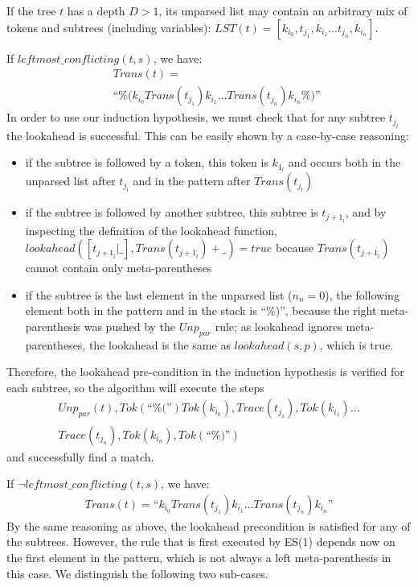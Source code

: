 \documentclass{sigplanconf}
\begin{document}
If the tree $t$ has a depth $D>1$, its unparsed list may contain an
arbitrary mix of tokens and subtrees (including variables):
$LST(t)=[k_{i_0}, t_{j_1}, k_{i_1} \dots t_{j_n}, k_{i_n}]$.

If $leftmost\_conflicting(t,s)$, we have:
\begin{eqnarray*}
&&Trans(t) = \\
&& \mbox{``\%(} k_{i_0}
Trans(t_{j_1}) k_{i_1} \dots Trans(t_{j_n}) k_{i_n}
\mbox{\%)''}\
\end{eqnarray*}
In order to use our induction hypothesis, we must check that for any
subtree $t_{j_l}$ the lookahead is successful. This can be easily
shown by a case-by-case reasoning:
\begin{itemize}
\item if the subtree is followed by a token, this token is $k_{1_l}$
and occurs both in the unparsed list after $t_{j_l}$ and in the pattern
after $Trans(t_{j_l})$
\item if the subtree is followed by another subtree, this
subtree is $t_{{j+1}_l}$, and by inspecting the definition of the
lookahead function, $lookahead([t_{{j+1}_l}|\_],
Trans(t_{{j+1}_l})+\_) = true$ because $Trans(t_{{j+1}_l})$
cannot contain only meta-parentheses
\item if the subtree is the last element in the unparsed list ($n_n=0$),
the following element both in the pattern and in the stack is ``\%)'',
because the right meta-parenthesis was pushed by the $Unp_{par}$ rule;
as lookahead ignores meta-parentheses, the lookahead is the same as
$lookahead(s,p)$, which is true.
\end{itemize}

Therefore, the lookahead pre-condition in the induction hypothesis is
verified for each subtree, so the algorithm will execute the steps
\begin{eqnarray*}
Unp_{par}(t), Tok(\mbox{``\%(''}) Tok(k_{i_0}), Trace(t_{j_1}), Tok(k_{i_1})\dots \\
Trace(t_{j_n}), Tok(k_{i_n}), Tok(\mbox{``\%)''})
\end{eqnarray*}
and successfully find a match.

If $\neg leftmost\_conflicting(t,s)$, we have:
\begin{eqnarray*}
Trans(t) = 
 \mbox{``}k_{i_0} Trans(t_{j_1}) k_{i_1}
\dots Trans(t_{j_n}) k_{i_n}\mbox{''}
\end{eqnarray*}
By the same reasoning as above, the lookahead precondition is
satisfied for any of the subtrees. However, the rule that is first
executed by ES(1) depends now on the first element in the pattern,
which is not always a left meta-parenthesis in this case. We
distinguish the following two sub-cases.
\end{document}
